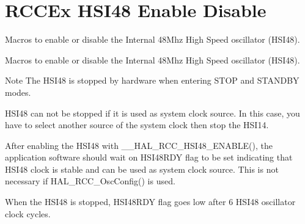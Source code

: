 \hypertarget{group___r_c_c_ex___h_s_i48___enable___disable}{}\section{R\+C\+C\+Ex H\+S\+I48 Enable Disable}
\label{group___r_c_c_ex___h_s_i48___enable___disable}


Macros to enable or disable the Internal 48\+Mhz High Speed oscillator (H\+S\+I48).  


Macros to enable or disable the Internal 48\+Mhz High Speed oscillator (H\+S\+I48). 

\begin{DoxyNote}{Note}
The H\+S\+I48 is stopped by hardware when entering S\+T\+OP and S\+T\+A\+N\+D\+BY modes. 

H\+S\+I48 can not be stopped if it is used as system clock source. In this case, you have to select another source of the system clock then stop the H\+S\+I14. 

After enabling the H\+S\+I48 with \+\_\+\+\_\+\+H\+A\+L\+\_\+\+R\+C\+C\+\_\+\+H\+S\+I48\+\_\+\+E\+N\+A\+B\+L\+E(), the application software should wait on H\+S\+I48\+R\+DY flag to be set indicating that H\+S\+I48 clock is stable and can be used as system clock source. This is not necessary if H\+A\+L\+\_\+\+R\+C\+C\+\_\+\+Osc\+Config() is used. 

When the H\+S\+I48 is stopped, H\+S\+I48\+R\+DY flag goes low after 6 H\+S\+I48 oscillator clock cycles. 
\end{DoxyNote}
